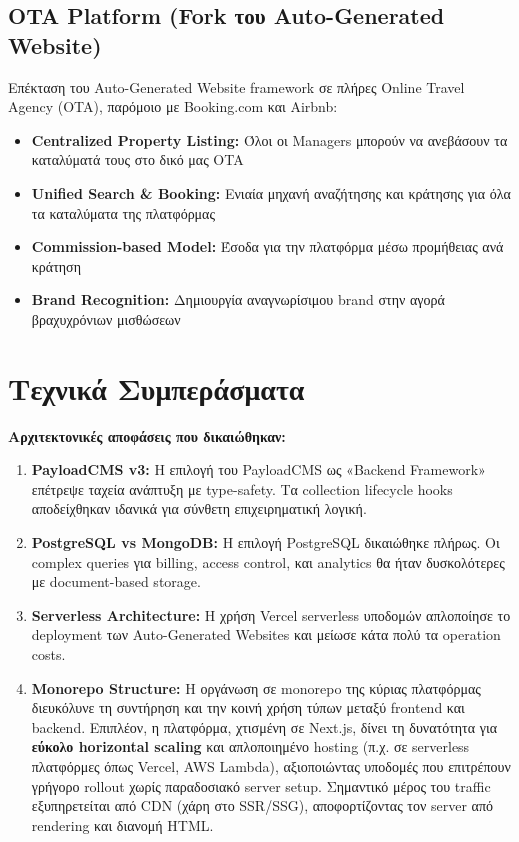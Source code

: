 \documentclass[
	12pt, %
	oneside, %
	greek,
	onehalfspacing, %
	liststotoc, %
	toctotoc, %
	parskip, %
	headsepline, %
]{MastersDoctoralThesis} %
\begin{document}
\subsection{OTA Platform (Fork του Auto-Generated Website)}

Επέκταση του Auto-Generated Website framework σε πλήρες Online Travel Agency (OTA), παρόμοιο με Booking.com και Airbnb:

\begin{itemize}
    \item \textbf{Centralized Property Listing:} Όλοι οι Managers μπορούν να ανεβάσουν τα καταλύματά τους στο δικό μας OTA
    \item \textbf{Unified Search \& Booking:} Ενιαία μηχανή αναζήτησης και κράτησης για όλα τα καταλύματα της πλατφόρμας
    \item \textbf{Commission-based Model:} Έσοδα για την πλατφόρμα μέσω προμήθειας ανά κράτηση
    \item \textbf{Brand Recognition:} Δημιουργία αναγνωρίσιμου brand στην αγορά βραχυχρόνιων μισθώσεων
\end{itemize}

\section{Τεχνικά Συμπεράσματα}
\label{sec:technical-conclusions}

\textbf{Αρχιτεκτονικές αποφάσεις που δικαιώθηκαν:}

\begin{enumerate}
    \item \textbf{PayloadCMS v3:} Η επιλογή του PayloadCMS ως «Backend Framework» επέτρεψε ταχεία ανάπτυξη με type-safety. Τα collection lifecycle hooks αποδείχθηκαν ιδανικά για σύνθετη επιχειρηματική λογική.
    \item \textbf{PostgreSQL vs MongoDB:} Η επιλογή PostgreSQL δικαιώθηκε πλήρως. Οι complex queries για billing, access control, και analytics θα ήταν δυσκολότερες με document-based storage.
    \item \textbf{Serverless Architecture:} Η χρήση Vercel serverless υποδομών απλοποίησε το deployment των Auto-Generated Websites και μείωσε κάτα πολύ τα operation costs.
    \item \textbf{Monorepo Structure:} Η οργάνωση σε monorepo της κύριας πλατφόρμας διευκόλυνε τη συντήρηση και την κοινή χρήση τύπων μεταξύ frontend και backend. Επιπλέον, η πλατφόρμα, χτισμένη σε Next.js, δίνει τη δυνατότητα για \textbf{εύκολο horizontal scaling} και απλοποιημένο hosting (π.χ. σε serverless πλατφόρμες όπως Vercel, AWS Lambda), αξιοποιώντας υποδομές που επιτρέπουν γρήγορο rollout χωρίς παραδοσιακό server setup. Σημαντικό μέρος του traffic εξυπηρετείται από CDN (χάρη στο SSR/SSG), αποφορτίζοντας τον server από rendering και διανομή HTML.
\end{enumerate}
\end{document}
